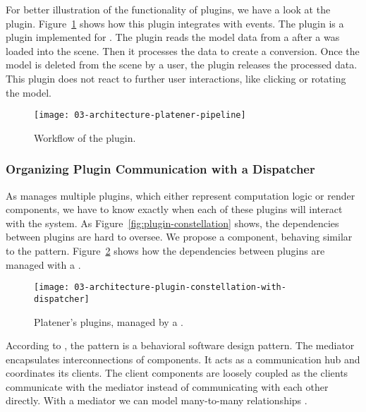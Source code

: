 \documentclass[../../ClassicThesis.tex]{subfiles}
\begin{document}
For better illustration of the functionality of plugins, we
have a look at the  plugin.
Figure~\ref{fig:workflow-platener-pipeline} shows how this
plugin integrates with {\convertify} events. The
 plugin is a plugin implemented for
{\platener}. The plugin reads the model data from a
 after a {\threedmodel} was loaded into the
scene. Then it processes the data to create a {\lasercutter}
conversion. Once the model is deleted from the scene by a
user, the plugin releases the processed data. This plugin
does not react to further user interactions, like clicking
or rotating the model.


\begin{figure}[h]
  \centering
  \texttt{[image: 03-architecture-platener-pipeline]}
  \caption{Workflow of the  plugin.}
  \label{fig:workflow-platener-pipeline}
\end{figure}

\subsubsection{Organizing Plugin Communication with a
  Dispatcher}


As {\convertify} manages multiple plugins, which either represent
computation logic or render components, we have to know exactly when
each of these plugins will interact with the system. As
Figure~\ref{fig:plugin-constellation} shows, the dependencies between
plugins are hard to oversee. We propose a 
component, behaving similar to the  pattern.
Figure~\ref{fig:plugin-constellation-with-dispatcher} shows how the
dependencies between plugins are managed with a .

\begin{figure}[h]
  \centering
  \texttt{[image: 03-architecture-plugin-constellation-with-dispatcher]}
  \caption{Platener's plugins, managed by a .}
  \label{fig:plugin-constellation-with-dispatcher}
\end{figure}

According to \citeauthor{gof}, the  pattern is a
behavioral software design pattern. The mediator encapsulates
interconnections of components. It acts as a communication hub and
coordinates its clients. The client components are loosely coupled as
the clients communicate with the mediator instead of communicating
with each other directly. With a mediator we can model many-to-many
relationships \cite[p. 273]{gof}.
\end{document}
